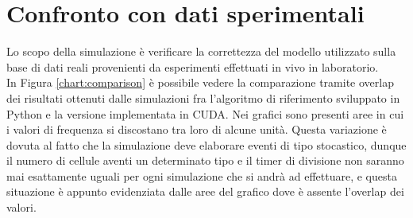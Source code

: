 \section{Confronto con dati sperimentali}

Lo scopo della simulazione è verificare la correttezza del modello utilizzato
sulla base di dati reali provenienti da esperimenti effettuati in vivo
in laboratorio.
\\
In Figura \ref{chart:comparison} è possibile vedere la comparazione tramite 
overlap dei
risultati ottenuti dalle simulazioni fra l'algoritmo di riferimento sviluppato
in Python e la versione implementata in CUDA.
Nei grafici sono presenti aree in cui
i valori di frequenza si discostano tra loro di alcune unità. Questa variazione
è dovuta al fatto che la simulazione deve elaborare eventi di tipo stocastico,
dunque il numero di cellule aventi un determinato tipo e il timer di divisione
non saranno mai esattamente uguali per ogni simulazione che si andrà ad
effettuare, e questa situazione è appunto evidenziata dalle aree del grafico
dove è assente l'overlap dei valori. 

